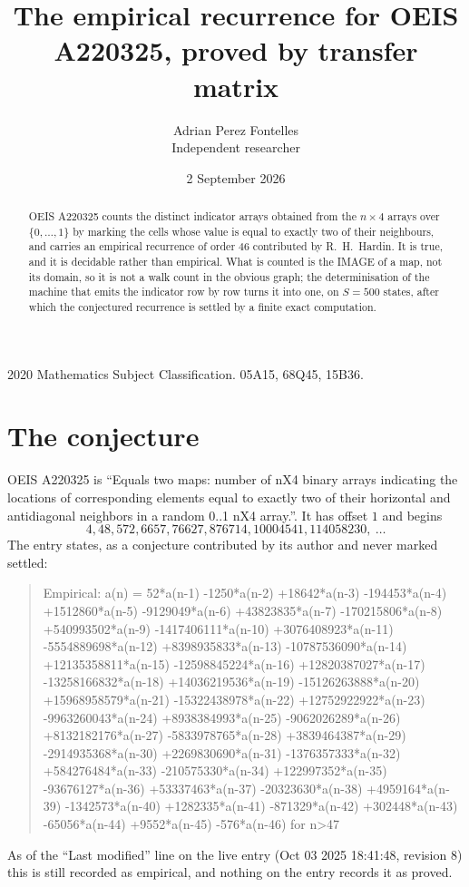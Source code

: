 \documentclass[11pt,a4paper]{article}
\title{The empirical recurrence for OEIS A220325, proved by transfer matrix}
\author{Adrian Perez Fontelles\\ \small Independent researcher}
\date{2 September 2026}
\theoremstyle{plain}
\theoremstyle{definition}
\begin{document}
\maketitle

\begin{abstract}
OEIS A220325 counts the distinct indicator arrays obtained from the $n\times4$ arrays over
$\{0,\dots,1\}$ by marking the cells whose value is equal to exactly two of their neighbours, and carries an
empirical recurrence of order $46$ contributed by R.~H.~Hardin. It is true, and it is
decidable rather than empirical. What is counted is the IMAGE of a map, not its domain, so it
is not a walk count in the obvious graph; the determinisation of the machine that emits the
indicator row by row turns it into one, on $S=500$ states, after which the conjectured
recurrence is settled by a finite exact computation.
\end{abstract}

\noindent\small 2020 Mathematics Subject Classification. 05A15, 68Q45, 15B36.\normalsize

\section{The conjecture}

OEIS A220325 is ``Equals two maps: number of nX4 binary arrays indicating the locations of corresponding elements equal to exactly two of their horizontal and antidiagonal neighbors in a random 0..1 nX4 array.''. It has offset $1$ and begins
\[
4, 48, 572, 6657, 76627, 876714, 10004541, 114058230,\ \dots
\]
The entry states, as a conjecture contributed by its author and never marked settled:
\begin{quote}
Empirical: a(n) = 52*a(n-1) -1250*a(n-2) +18642*a(n-3) -194453*a(n-4) +1512860*a(n-5) -9129049*a(n-6) +43823835*a(n-7) -170215806*a(n-8) +540993502*a(n-9) -1417406111*a(n-10) +3076408923*a(n-11) -5554889698*a(n-12) +8398935833*a(n-13) -10787536090*a(n-14) +12135358811*a(n-15) -12598845224*a(n-16) +12820387027*a(n-17) -13258166832*a(n-18) +14036219536*a(n-19) -15126263888*a(n-20) +15968958579*a(n-21) -15322438978*a(n-22) +12752922922*a(n-23) -9963260043*a(n-24) +8938384993*a(n-25) -9062026289*a(n-26) +8132182176*a(n-27) -5833978765*a(n-28) +3839464387*a(n-29) -2914935368*a(n-30) +2269830690*a(n-31) -1376357333*a(n-32) +584276484*a(n-33) -210575330*a(n-34) +122997352*a(n-35) -93676127*a(n-36) +53337463*a(n-37) -20323630*a(n-38) +4959164*a(n-39) -1342573*a(n-40) +1282335*a(n-41) -871329*a(n-42) +302448*a(n-43) -65056*a(n-44) +9552*a(n-45) -576*a(n-46) for n>47
\end{quote}
As of the ``Last modified'' line on the live entry (Oct 03 2025 18:41:48, revision 8) this is still
recorded as empirical, and nothing on the entry records it as proved.
\end{document}
